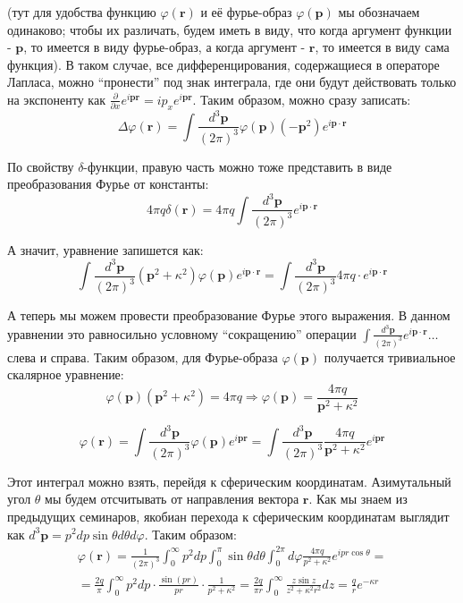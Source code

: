 \documentclass[a4paper,12pt]{article}
\begin{document}
\noindent
(тут для удобства функцию $\varphi(\mathbf{r})$ и её фурье-образ
$\varphi(\mathbf{p})$ мы обозначаем одинаково; чтобы их различать,
будем иметь в виду, что когда аргумент функции - $\mathbf{p}$, то
имеется в виду фурье-образ, а когда аргумент - $\mathbf{r}$, то имеется
в виду сама функция). В таком случае, все дифференцирования, содержащиеся
в операторе Лапласа, можно ``пронести'' под знак интеграла, где
они будут действовать только на экспоненту как $\frac{\partial}{\partial x}e^{i\mathbf{p}\mathbf{r}}=ip_{x}e^{i\mathbf{p}\mathbf{r}}$.
Таким образом, можно сразу записать:
\[
\Delta\varphi(\mathbf{r})=\int\frac{d^{3}\mathbf{p}}{\left(2\pi\right)^{3}}\varphi(\mathbf{p})(-\mathbf{p}^{2})e^{i\mathbf{p}\cdot\mathbf{r}}
\]


\noindent
По свойству $\delta$-функции, правую часть можно тоже представить
в виде преобразования Фурье от константы:
\[
4\pi q\delta(\mathbf{r})=4\pi q\int\frac{d^{3}\mathbf{p}}{(2\pi)^{3}}e^{i\mathbf{p}\cdot\mathbf{r}}
\]


\noindent
А значит, уравнение запишется как:
\[
\int\frac{d^{3}\mathbf{p}}{(2\pi)^{3}}(\mathbf{p}^{2}+\kappa^{2})\varphi(\mathbf{p})e^{i\mathbf{p}\cdot\mathbf{r}}=\int\frac{d^{3}\mathbf{p}}{(2\pi)^{3}}4\pi q\cdot e^{i\mathbf{p}\cdot\mathbf{r}}
\]


\noindent
А теперь мы можем провести преобразование Фурье этого выражения. В
данном уравнении это равносильно условному ``сокращению'' операции
$\int\frac{d^{3}\mathbf{p}}{\left(2\pi\right)^{3}}e^{i\mathbf{p}\cdot\mathbf{r}}\dots$
слева и справа. Таким образом, для Фурье-образа $\varphi(\mathbf{p})$
получается тривиальное скалярное уравнение:
\[
\varphi(\mathbf{p})(\mathbf{p}^{2}+\kappa^{2})=4\pi q\Rightarrow\varphi(\mathbf{p})=\frac{4\pi q}{\mathbf{p}^{2}+\kappa^{2}}
\]


\[
\varphi(\mathbf{r})=\int\frac{d^{3}\mathbf{p}}{(2\pi)^{3}}\varphi(\mathbf{p})e^{i\mathbf{p}\mathbf{r}}=\int\frac{d^{3}\mathbf{p}}{(2\pi)^{3}}\frac{4\pi q}{\mathbf{p}^{2}+\kappa^{2}}e^{i\mathbf{p}\mathbf{r}}
\]


\noindent
Этот интеграл можно взять, перейдя к сферическим координатам. Азимутальный
угол $\theta$ мы будем отсчитывать от направления вектора $\mathbf{r}$.
Как мы знаем из предыдущих семинаров, якобиан перехода к сферическим
координатам выглядит как $d^{3}\mathbf{p}=p^{2}dp\sin\theta d\theta d\varphi$.
Таким образом:
\begin{multline*}
\varphi(\mathbf{r})=\frac{1}{(2\pi)^{3}}\int_{0}^{\infty}p^{2}dp\int_{0}^{\pi}\sin\theta d\theta\int_{0}^{2\pi}d\varphi\frac{4\pi q}{p^{2}+\kappa^{2}}e^{ipr\cos\theta}=\\
=\frac{2q}{\pi}\int_{0}^{\infty}p^{2}dp\cdot\frac{\sin(pr)}{pr}\cdot\frac{1}{p^{2}+\kappa^{2}}=\frac{2q}{\pi r}\int_{0}^{\infty}\frac{z\sin z}{z^{2}+\kappa^{2}r^{2}}dz=\frac{q}{r}e^{-\kappa r}
\end{multline*}
\end{document}
